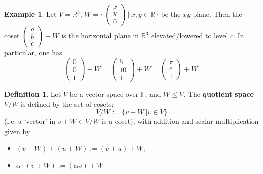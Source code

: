 \documentclass[11pt,openany]{book}
\theoremstyle{plain}
\theoremstyle{definition}
\newtheorem{definition}[definition]{Definition}
\newtheorem{example}[example]{Example}
\theoremstyle{remark}
\begin{document}
\begin{example} \label{eg-xyplane}
    Let $V = \mathbb{R}^3$, $W = \{\begin{pmatrix} x \\ y \\ 0 \end{pmatrix}\ |\ x,y \in \mathbb{R}\}$ be the $xy$-plane. Then the coset
    $\begin{pmatrix} a \\ b \\ c \end{pmatrix} + W$ is the horizontal plane in $\mathbb{R}^3$ elevated/lowered to level $c$. In particular, one has
    $$\begin{pmatrix} 0 \\ 0 \\ 1 \end{pmatrix} + W = \begin{pmatrix} 5 \\ 10 \\ 1 \end{pmatrix} + W = \begin{pmatrix} \pi \\ e \\ 1 \end{pmatrix} + W.$$
\end{example}

\begin{definition}
    Let $V$ be a vector space over $\mathbb{F}$, and $W \leq V$. The {\bf quotient space} $V/W$ is defined by the set of cosets:
    $$V/W := \{v + W\ | v \in V\}$$
    (i.e. a `vector' in $v + W \in V/W$ is a coset), with addition and scalar multiplication given by
    \begin{itemize}
        \item $(v+W)+(u+W) := (v+u)+W$;
        \item $\alpha \cdot (v+W) := (\alpha v) + W$
    \end{itemize}
\end{definition}
\end{document}
